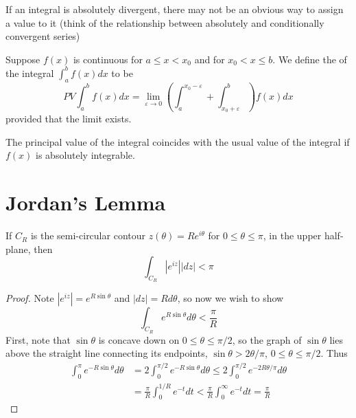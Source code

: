 \documentclass[12pt, a4paper, oneside, openright, titlepage]{book}
\begin{document}
If an integral is absolutely divergent, there may not be an obvious way to assign a value to it (think of the relationship between absolutely and conditionally convergent series)

\begin{defn}
    Suppose $f(x)$ is continuous for $a \leq x < x_0$ and for $x_0 < x\leq b$. We define the  of the integral $\int_a^bf(x)dx$ to be \begin{equation*}
        PV\int_a^bf(x)dx = \lim\limits_{\varepsilon\rightarrow 0}\left(\int_a^{x_0-\varepsilon}+\int_{x_0+\varepsilon}^b\right)f(x)dx
    \end{equation*}
    provided that the limit exists.
\end{defn}
The principal value of the integral coincides with the usual value of the integral if $f(x)$ is absolutely integrable.



\section{Jordan's Lemma}

\begin{lem}
    If $C_R$ is the semi-circular contour $z(\theta) = Re^{i\theta}$ for $0 \leq \theta \leq \pi$, in the upper half-plane, then \begin{equation*}
        \int_{C_R}|e^{iz}||dz| < \pi
    \end{equation*}
\end{lem}
\begin{proof}
    Note $|e^{iz}| = e^{R\sin\theta}$ and $|dz| = Rd\theta$, so now we wish to show \begin{equation*}
        \int_{C_R}e^{R\sin\theta}d\theta < \frac{\pi}{R}
    \end{equation*}
    First, note that $\sin\theta$ is concave down on $0\leq \theta\leq \pi/2$, so the graph of $\sin\theta$ lies above the straight line connecting its endpoints, $\sin\theta >2\theta/\pi$, $0\leq\theta\leq \pi/2$. Thus \begin{align*}
        \int_0^{\pi}e^{-R\sin\theta}d\theta &= 2\int_0^{\pi/2}e^{-R\sin\theta}d\theta \leq 2 \int_0^{\pi/2}e^{-2R\theta/\pi}d\theta \\
        &= \frac{\pi}{R}\int_0^{1/R}e^{-t}dt < \frac{\pi}{R}\int_0^{\infty}e^{-t}dt = \frac{\pi}{R}
    \end{align*}
\end{proof}
\end{document}
